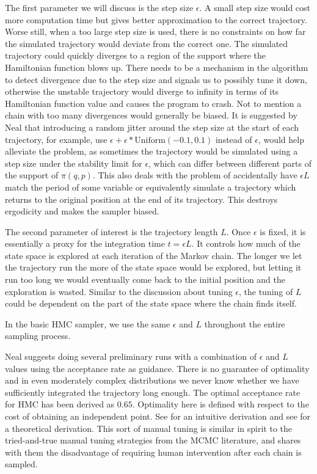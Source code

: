 \documentclass[]{report}
\begin{document}
The first parameter we will discuss is the step size $\epsilon$. A small step size would cost more computation time but gives better approximation to the correct trajectory. Worse still, when a too large step size is used, there is no constraints on how far the simulated trajectory would deviate from the correct one. The simulated trajectory could quickly diverges to a region of the support where the Hamiltonian function blows up. There needs to be a mechanism in the algorithm to detect divergence due to the step size and signals us to possibly tune it down, otherwise the unstable trajectory would diverge to infinity in terms of its Hamiltonian function value and causes the program to crash. Not to mention a chain with too many divergences would generally be biased. It is suggested by Neal that introducing a random jitter around the step size at the start of each trajectory, for example, use $\epsilon + \epsilon*\text{Uniform}(-0.1,0.1)$ instead of $\epsilon$,  would help alleviate the problem, as sometimes the trajectory would be simulated using a step size under the stability limit for $\epsilon$, which can differ between different parts of the support of $\pi(q,p)$. This also deals with the problem of accidentally have $\epsilon L$ match the period of some variable or equivalently simulate a trajectory which returns to the original position at the end of its trajectory. This destroys ergodicity and makes the sampler biased. 

The second parameter of interest is the trajectory length $L$. Once $\epsilon$ is fixed, it is essentially a proxy for the integration time $t= \epsilon L$. It controls how much of the state space is explored at each iteration of the Markov chain. The longer we let the trajectory run the more of the state space would be explored, but letting it run too long we would eventually come back to the initial position and the exploration is wasted. Similar to the discussion about tuning $\epsilon$, the tuning of $L$ could be dependent on the part of the state space where the chain finds itself.

In the basic HMC sampler, we use the same $\epsilon$ and $L$ throughout the
entire sampling process.  

Neal \cite{neal1996sampling} suggests doing several preliminary runs with a combination of $\epsilon$ and $L$ values using the acceptance rate as guidance. There is no guarantee of optimality and in even moderately complex distributions we never know whether we have sufficiently integrated the trajectory long enough. The optimal acceptance rate for HMC has been derived as $0.65$. Optimality here is defined with respect to the cost of obtaining an independent point. See \cite{neal2011mcmc} for an intuitive derivation and see \cite{beskos2013optimal} for a theoretical derivation. This sort of manual tuning is similar in spirit to the tried-and-true manual tuning strategies from the MCMC literature, and shares with them the disadvantage of requiring human intervention after each chain is sampled. 
\end{document}
